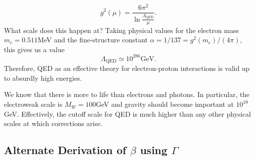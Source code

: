 \begin{equation}
  g^2 (\mu) = \frac{6 \pi^2}{\ln \frac{\Lambda_{\text{QED}}}{\mu}}.
\end{equation}
What scale does this happen at? Taking physical values for the electron mass $m_e = 0.511$MeV and the fine-structure constant $\alpha = 1 / 137 = g^2(m_e) / (4 \pi)$, this gives us a value
\begin{equation}
  \Lambda_{\text{QED}} \simeq 10^{286} \text{GeV}.
\end{equation}
Therefore, QED as an effective theory for electron-proton interactions is valid up to absurdly high energies.
\begin{remark}
  We know that there is more to life than electrons and photons. In particular, the electroweak scale is $M_W = 100$GeV and gravity should become important at $10^{19}$GeV.
  Effectively, the cutoff scale for QED is much higher than any other physical scales at which corrections arise.
\end{remark}

\subsection*{Alternate Derivation of $\beta$ using $\Gamma$}%

